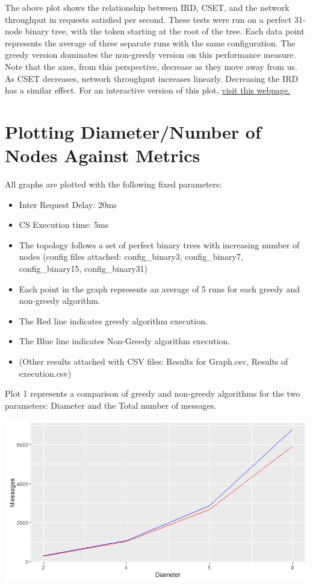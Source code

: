 \documentclass{article}
\begin{document}
The above plot shows the relationship between IRD, CSET, and the network throughput in requests satisfied per second. These tests were run on a perfect 31-node binary tree, with the token starting at the root of the tree. Each data point represents the average of three separate runs with the same configuration. The greedy version dominates the non-greedy version on this performance measure. Note that the axes, from this perspective, decrease as they move away from us. As CSET decreases, network throughput increases linearly. Decreasing the IRD has a similar effect. For an interactive version of this plot, \href{https://plot.ly/~tgduckworth/6/}{visit this webpage.}

\section{Plotting Diameter/Number of Nodes Against Metrics}

All graphs are plotted with the following fixed parameters:

\begin{itemize}
    \item Inter Request Delay: 20ms
    \item CS Execution time: 5ms
    \item The topology follows a set of perfect binary trees with increasing number of nodes (config files attached: config\_binary3, config\_binary7, config\_binary15, config\_binary31)
    \item Each point in the graph represents an average of 5 runs for each greedy and non-greedy algorithm.
    \item The Red line indicates greedy algorithm execution.
    \item The Blue line indicates Non-Greedy algorithm execution.
    \item (Other results attached with CSV files: Results for Graph.csv, Results of execution.csv)
\end{itemize}

Plot 1 represents a comparison of greedy and non-greedy algorithms for the two parameters: Diameter and the Total number of messages. \\

\begin{center}
    \includegraphics[width=\textwidth]{figs/Plot1} \\
\end{center}
\end{document}
